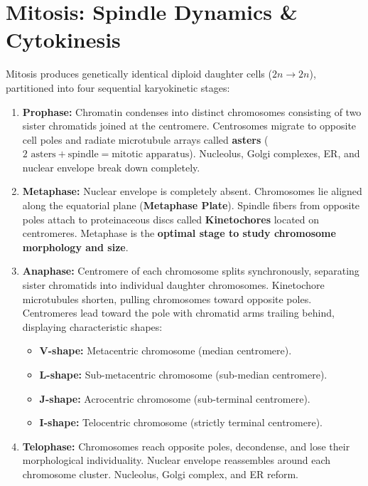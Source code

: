 \documentclass[10pt,twoside,openright]{book}
\begin{document}
\section{Mitosis: Spindle Dynamics \& Cytokinesis}

\begin{conceptbox}
Mitosis produces genetically identical diploid daughter cells ($2n \to 2n$), partitioned into four sequential karyokinetic stages:
\begin{enumerate}[leftmargin=*]
  \item \textbf{Prophase:} Chromatin condenses into distinct chromosomes consisting of two sister chromatids joined at the centromere. Centrosomes migrate to opposite cell poles and radiate microtubule arrays called \textbf{asters} ($2\text{ asters} + \text{spindle} = \text{mitotic apparatus}$). Nucleolus, Golgi complexes, ER, and nuclear envelope break down completely.
  \item \textbf{Metaphase:} Nuclear envelope is completely absent. Chromosomes lie aligned along the equatorial plane (\textbf{Metaphase Plate}). Spindle fibers from opposite poles attach to proteinaceous discs called \textbf{Kinetochores} located on centromeres. Metaphase is the \textbf{optimal stage to study chromosome morphology and size}.
  \item \textbf{Anaphase:} Centromere of each chromosome splits synchronously, separating sister chromatids into individual daughter chromosomes. Kinetochore microtubules shorten, pulling chromosomes toward opposite poles. Centromeres lead toward the pole with chromatid arms trailing behind, displaying characteristic shapes:
  \begin{itemize}
    \item \textbf{V-shape:} Metacentric chromosome (median centromere).
    \item \textbf{L-shape:} Sub-metacentric chromosome (sub-median centromere).
    \item \textbf{J-shape:} Acrocentric chromosome (sub-terminal centromere).
    \item \textbf{I-shape:} Telocentric chromosome (strictly terminal centromere).
  \end{itemize}
  \item \textbf{Telophase:} Chromosomes reach opposite poles, decondense, and lose their morphological individuality. Nuclear envelope reassembles around each chromosome cluster. Nucleolus, Golgi complex, and ER reform.
\end{enumerate}


\end{conceptbox}
\end{document}
